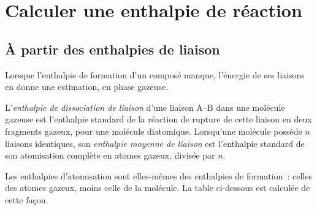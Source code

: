 \section{Calculer une enthalpie de réaction}

\subsection*{À partir des enthalpies de liaison}

Lorsque l'enthalpie de formation d'un composé manque, l'énergie de ses
liaisons en donne une estimation, en phase gazeuse.

\begin{definition}\label{def:b2:reaction-enthalpy:bond-enthalpy}
L'\emph{enthalpie de dissociation de liaison} d'une
liaison A--B dans une molécule gazeuse est l'enthalpie standard de la
réaction de rupture de cette liaison en deux fragments gazeux, 
pour une molécule diatomique. Lorsqu'une molécule possède $n$ liaisons identiques, son
\emph{enthalpie moyenne de liaison} est l'enthalpie
standard de son atomisation complète en atomes gazeux, divisée par $n$.
\end{definition}

Les enthalpies d'atomisation sont elles-mêmes des enthalpies de formation~: celles des
atomes gazeux, moins celle de la molécule. La table ci-dessous est
calculée de cette façon.

